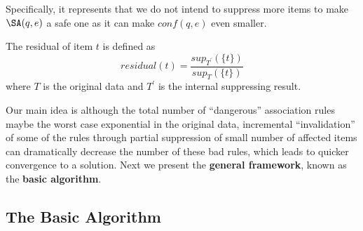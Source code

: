 Specifically, it represents that we do not intend to suppress more items to
make $\SA(q,e)$ a safe one as it can make $conf(q,e)$ even smaller.
\begin{definition}
The residual of item $t$ is defined as
\[ residual(t)=\frac{sup_{T^\prime}(\{t\})}{sup_T(\{t\})} \]
where $T$ is the original data and $T^\prime$ is the internal suppressing
result.
\end{definition}

Our main idea is although the total number of ``dangerous'' association rules
maybe the worst case exponential in the original data, incremental
``invalidation'' of some of the rules through partial suppression of small
number of affected items can dramatically decrease the number of these bad
rules, which leads to quicker convergence to a solution.
%
Next we present the \textbf{general framework}, known as the \textbf{basic
algorithm}.

\subsection{The Basic Algorithm}
%

